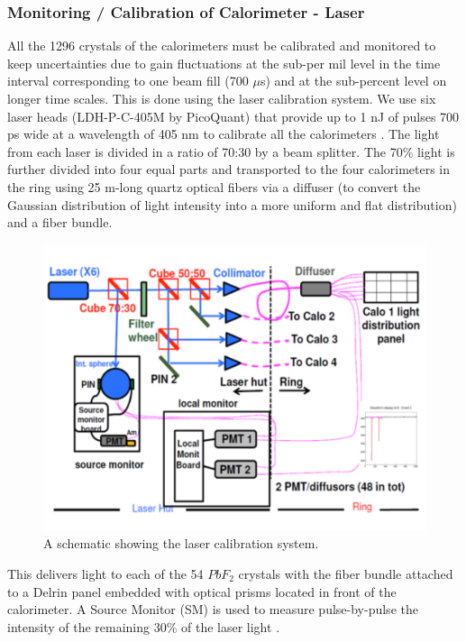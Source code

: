 \documentclass[journal,article,submit,moreauthors,pdftex,10pt,a4paper]{Definitions/mdpi}
\begin{document}
\subsubsection{Monitoring / Calibration of Calorimeter - Laser}
All the 1296 crystals of the calorimeters must be calibrated and monitored to
keep uncertainties due to gain fluctuations at the sub-per mil level in the time 
interval corresponding to one beam fill (700 $\mu$s) and
at the sub-percent level on longer time scales. This is done using the laser calibration system. 
We use six laser heads (LDH-P-C-405M by PicoQuant) that provide up to 1 nJ of pulses 700 ps wide 
at a wavelength of 405 nm to calibrate all the calorimeters \cite{anas}.
The light from each laser is divided in a ratio of 
70:30 by a beam splitter. The 70\% light is further divided into four equal
parts and transported to the four calorimeters in
the ring using 25 m-long quartz optical fibers via a diffuser (to convert the 
Gaussian distribution of light intensity into a more uniform and flat distribution) and a fiber bundle.
\begin{figure}[H]
\centering
\includegraphics[width=9 cm]{laser_sys.pdf}
\caption{\label{fig7}A schematic showing the laser calibration system. }
\end{figure}  
This delivers light to each of the 54 $PbF_2$ crystals with the fiber bundle attached to a 
Delrin panel embedded with optical prisms located in front of the calorimeter. 
A Source Monitor (SM) is used to measure pulse-by-pulse
the intensity of the remaining 30\% of the laser light \cite{c2}. 
\end{document}
